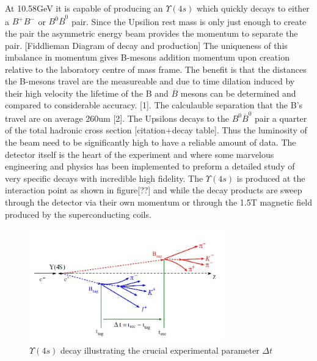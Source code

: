 \documentclass[floatfix,aps,prd,amsmath,amssymb]{revtex4}
\begin{document}
At 10.58GeV it is capable of producing an $\Upsilon(4s)$ which quickly decays to either a $B^+B^-$ or $B^0\overline{B}^0$ pair. Since the Upsilion rest mass is only just enough to create the pair the asymmetric energy beam provides the momentum to separate the pair.
[Fiddlieman Diagram of decay and production]
The uniqueness of this imbalance in momentum gives B-mesons addition momentum upon creation relative to the laboratory centre of mass frame. The benefit is that the distances the B-mesons travel are the measureable and due to time dilation induced by their high velocity the lifetime of the B and $\overline{B}$ mesons can be determined and compared to considerable accuracy. [1]. The calculauble separation that the B’s travel are on average 260um [2]. The Upsilons decays to the $B^0 \overline{B}^0$ pair a quarter of  the total hadronic cross section [citation+decay table]. Thus the luminosity of the beam need to be significantly high to have a reliable amount of data.
The detector itself is the heart of the experiment and where some marvelous engineering and physics has been implemented to preform a detailed study of very specific decays with incredible high fidelity. The $\Upsilon(4s)$ is produced at the interaction point as shown in figure[??] and while the decay products are sweep through the detector via their own momentum or through the 1.5T magnetic field produced by the superconducting coils. 

\begin{figure}[h]
\centering
\includegraphics[width=0.75\textwidth]{figs/dt.jpg}
\caption{$\Upsilon (4s)$ decay illustrating the crucial experimental parameter $\Delta t$}
\label{BBD}
\end{figure}
\end{document}
